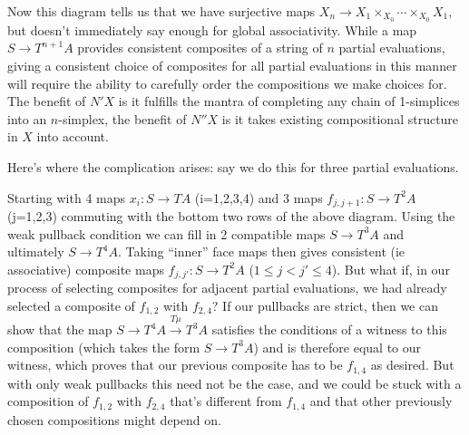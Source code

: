 \documentclass{amsart}
\begin{document}
Now this diagram tells us that we have surjective maps $X_n \to X_1 \times_{X_0} \cdots \times_{X_0} X_1$, but doesn't immediately say enough for global associativity.  While a map $S \to T^{n+1} A$ provides consistent composites of a string of $n$ partial evaluations, giving a consistent choice of composites for all partial evaluations in this manner will require the ability to carefully order the compositions we make choices for.  The benefit of $N'X$ is it fulfills the mantra of completing any chain of 1-simplices into an $n$-simplex, the benefit of $N''X$ is it takes existing compositional structure in $X$ into account.

Here's where the complication arises: say we do this for three partial evaluations.

\begin{center}\end{center}

Starting with 4 maps $x_i : S \to TA$ (i=1,2,3,4) and 3 maps $f_{j,j+1} : S \to T^2 A$ (j=1,2,3) commuting with the bottom two rows of the above diagram.  Using the weak pullback condition we can fill in 2 compatible maps $S \to T^3 A$ and ultimately $S \to T^4 A$.  Taking ``inner'' face maps then gives consistent (ie associative) composite maps $f_{j,j'} : S \to T^2 A$ ($1 \leq j < j' \leq 4$).  But what if, in our process of selecting composites for adjacent partial evaluations, we had already selected a composite of $f_{1,2}$ with $f_{2,4}$?  If our pullbacks are strict, then we can show that the map $S \rightarrow T^4 A \xrightarrow{T \mu} T^3 A$ satisfies the conditions of a witness to this composition (which takes the form $S \to T^3 A$) and is therefore equal to our witness, which proves that our previous composite has to be $f_{1,4}$ as desired.  But with only weak pullbacks this need not be the case, and we could be stuck with a composition of $f_{1,2}$ with $f_{2,4}$ that's different from $f_{1,4}$ and that other previously chosen compositions might depend on.
\end{document}
